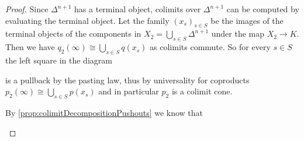\begin{lemma}
\begin{proof}
        Since $\Delta^{n+1}$ has a terminal object, colimits over $\Delta^{n+1}$ can be computed by evaluating the terminal object.
        Let the family $(x_s)_{s\in S}$ be the images of the terminal objects of the components in $X_2=\bigcup\limits_{s\in S} \Delta^{n+1}$ under the map $X_2\to K$.
        Then we have $q_2(\infty)\cong\bigcup\limits_{s\in S} q(x_s)$ as colimits commute.
        So for every $s\in S$ the left square in the diagram
        \begin{center}
        \end{center}
        is a pullback by the pasting law, thus by universality for coproducts $p_2(\infty)\cong\bigcup\limits_{s\in S} p(x_s)$ and in particular $p_2$ is a colimit cone.
        
        By \cref{prop:colimitDecompositionPushouts} we know that 
        \begin{center}
\end{center}
\end{proof}
\end{lemma}
